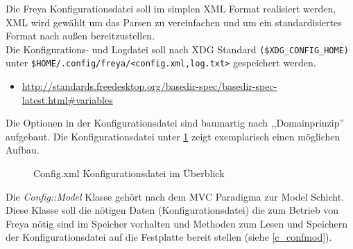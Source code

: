 Die Freya Konfigurationsdatei soll im simplen XML Format realisiert werden, XML wird gewählt um das Parsen zu vereinfachen und um
ein standardisiertes Format nach außen bereitzustellen. 
\\
Die Konfigurations- und Logdatei soll nach XDG Standard \verb+($XDG_CONFIG_HOME)+ unter \verb+$HOME/.config/freya/<config.xml,log.txt>+ gespeichert werden.

\begin{itemize}

	\item \url{http://standards.freedesktop.org/basedir-spec/basedir-spec-latest.html#variables}

\end{itemize}

Die Optionen in der Konfigurationsdatei sind baumartig nach ,,Domainprinzip'' aufgebaut. Die Konfigurationsdatei unter \ref{c_config}
zeigt exemplarisch einen möglichen Aufbau.

\begin{figure}[htb!]

\caption{Config.xml Konfigurationsdatei im Überblick}
\label{c_config}
\end{figure}


Die \emph{Config::Model} Klasse gehört nach dem MVC Paradigma zur Model Schicht. Diese Klasse soll die nötigen Daten (Konfigurationsdatei)
die zum Betrieb von Freya nötig sind im Speicher vorhalten und Methoden zum Lesen und Speichern der Konfigurationsdatei auf die Festplatte 
bereit stellen (siehe \ref{c_confmod}).

